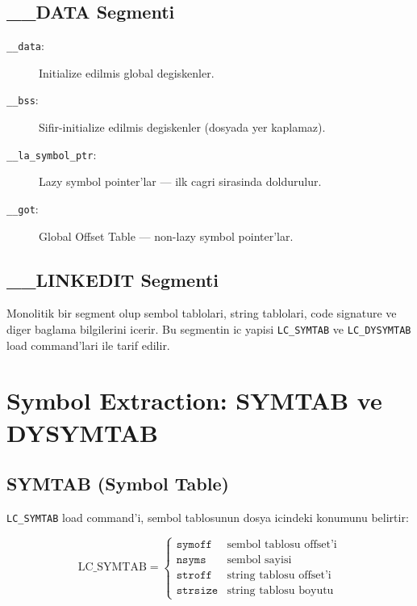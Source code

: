 \subsection{\_\_DATA Segmenti}

\begin{description}
\item[\texttt{\_\_data}:] Initialize edilmis global degiskenler.
\item[\texttt{\_\_bss}:] Sifir-initialize edilmis degiskenler (dosyada yer kaplamaz).
\item[\texttt{\_\_la\_symbol\_ptr}:] Lazy symbol pointer'lar --- ilk cagri sirasinda doldurulur.
\item[\texttt{\_\_got}:] Global Offset Table --- non-lazy symbol pointer'lar.
\end{description}

\subsection{\_\_LINKEDIT Segmenti}

Monolitik bir segment olup sembol tablolari, string tablolari, code signature ve diger baglama bilgilerini icerir. Bu segmentin ic yapisi \texttt{LC\_SYMTAB} ve \texttt{LC\_DYSYMTAB} load command'lari ile tarif edilir.


\section{Symbol Extraction: SYMTAB ve DYSYMTAB}
\label{sec:symbol-extraction}

\subsection{SYMTAB (Symbol Table)}

\texttt{LC\_SYMTAB} load command'i, sembol tablosunun dosya icindeki konumunu belirtir:

\begin{equation}
\label{eq:symtab-struct}
\text{LC\_SYMTAB} =
\begin{cases}
\texttt{symoff}  & \text{sembol tablosu offset'i} \\
\texttt{nsyms}   & \text{sembol sayisi} \\
\texttt{stroff}  & \text{string tablosu offset'i} \\
\texttt{strsize} & \text{string tablosu boyutu}
\end{cases}
\end{equation}

